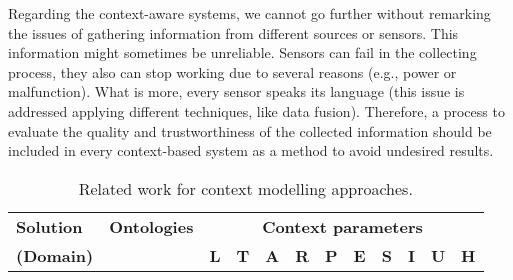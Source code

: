 Regarding the context-aware systems, we cannot go further without remarking the 
issues of gathering information from different sources or sensors. This 
information might sometimes be unreliable. Sensors can fail in the collecting 
process, they also can stop working due to several reasons (e.g., power or 
malfunction). What is more, every sensor speaks its language (this issue is 
addressed applying different techniques, like data fusion). Therefore, a process 
to evaluate the quality and trustworthiness of the collected information should 
be included in every context-based system as a method to avoid undesired results.

\begin{table}
 \caption{Related work for context modelling approaches.}
 \label{tbl:context_comparison}
 \footnotesize
 \centering

\begin{tabular}{l c c c c c c c c c c c }
  \hline 
 \textbf{Solution} & \textbf{Ontologies} & \multicolumn{10}{c}{\textbf{Context parameters}} \\
 
 \textbf{(Domain)} & & \textbf{L} & \textbf{T} & \textbf{A} & \textbf{R} & \textbf{P} & \textbf{E} & \textbf{S} & \textbf{I} & \textbf{U} & \textbf{H}\\
    \hline 
        

\end{tabular}
\end{table}

